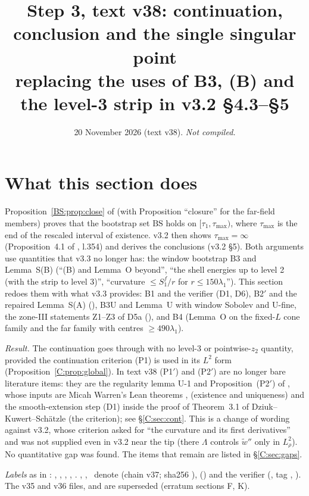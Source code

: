 \documentclass[11pt]{article}
\title{Step 3, text v38: continuation, conclusion and the single singular point\\[2pt]\large replacing the uses of B3, (B) and the level-3 strip in v3.2 \S4.3--\S5}
\author{}\date{20 November 2026 (text v38). \emph{Not compiled.}}
\begin{document}
\maketitle
\fi

\section{What this section does}\label{C:sec:intro}
Proposition~\ref{BS:prop:close} of  (with  Proposition ``closure'' for the far-field members) proves that the bootstrap set $\mathrm{BS}$ holds on $[\tau_1,\tau_{\max})$, where $\tau_{\max}$ is the end of the rescaled interval of existence. v3.2 then shows $\tau_{\max}=\infty$ (Proposition~4.1 of , l.354) and derives the conclusions (v3.2 \S5). Both arguments use quantities that v3.3 no longer has: the window bootstrap B3 and Lemma~S(B) (``(B) and Lemma~O beyond'', ``the shell energies up to level 2 (with the strip to level 3)'', ``curvature $\le S_1^f/r$ for $r\le150\lambda_1$''). This section redoes them with what v3.3 provides: B1 and the verifier (D1, D6), B2$'$ and the repaired Lemma~S(A) (), B3U and Lemma~U with window Sobolev and U-fine, the zone-III statements Z1--Z3 of D5a (), and B4 (Lemma~O on the fixed-$L$ cone family and the far family with centres $\ge490\lambda_1$).

\noindent\emph{Result.} The continuation goes through with no level-3 or pointwise-$z_2$ quantity, provided the continuation criterion (P1) is used in its $L^2$ form (Proposition~\ref{C:prop:global}). In text v38 (P1$'$) and (P2$'$) are no longer bare literature items: they are the regularity lemma U-1 and Proposition~(P2$'$) of  \tH, whose inputs are Micah Warren's Lean theorems ,  \cite{CWFlow} (existence and uniqueness) and the smooth-extension step (D1) inside the proof of Theorem~3.1 of Dziuk--Kuwert--Sch\"atzle \cite{DKS2002} (the criterion); see \S\ref{C:sec:cont}. This is a change of wording against v3.2, whose criterion asked for ``the curvature and its first derivatives'' and was not supplied even in v3.2 near the tip (there $\Lambda$ controls $\tilde w''$ only in $L^2_\rho$). No quantitative gap was found. The items that remain are listed in \S\ref{C:sec:gaps}.

\noindent\emph{Labels} as in : \tC, \tP, \tH, \tE, \tB. \SU, \SZ, \SV\ denote  (chain v37; sha256 ),  () and the verifier  (, tag , ). The v35 and v36 files,  and  are superseded (erratum sections F, K).
\end{document}
